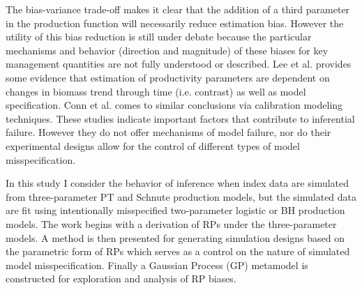 \documentclass[11pt]{ucscthesis}
\begin{document}
{%
The bias-variance trade-off \cite{ramasubramanian_machine_2017} makes it
clear that the addition of a third parameter in the production function will
necessarily reduce estimation bias. However the utility of this bias reduction
is still under debate because the particular mechanisms and behavior (direction and magnitude) %
of these biases for key management quantities %
are not fully understood or described. Lee et al. \cite{lee_can_2012} provides some
evidence that estimation of productivity parameters %
are dependent on changes in biomass trend through time (i.e. contrast) as well %
as model specification. Conn et al. \cite{conn_when_2010} comes to similar conclusions %
via calibration modeling techniques. These studies indicate important factors that
contribute to inferential failure. However they do not offer mechanisms of model
failure, nor do their experimental designs allow for the control of different
types of model misspecification.





In this study I consider the behavior of inference when index data are simulated
from three-parameter PT and Schnute production models, but the simulated data are fit
using intentionally misspecified two-parameter logistic or BH production models.
%
The work begins with a derivation of RPs under the three-parameter models. %
A method is then presented for generating simulation designs based on the parametric
form of RPs which serves as a control on the nature of simulated model misspecification.
Finally a Gaussian Process (GP) metamodel \cite{gramacy_surrogates_2020}
is constructed for exploration and analysis of RP biases.

}
\end{document}
